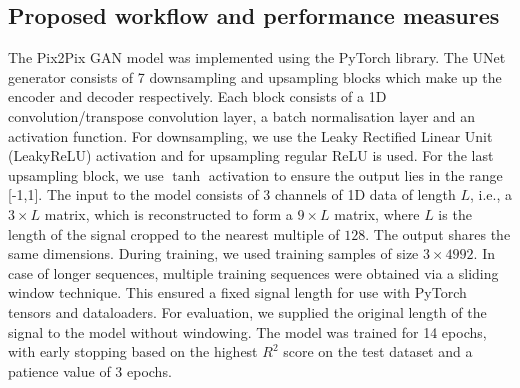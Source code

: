 \documentclass[conference]{IEEEtran}
\begin{document}
\subsection{Proposed workflow and performance measures} 




The Pix2Pix GAN model was implemented using the PyTorch library. The UNet generator consists of 7 downsampling and upsampling blocks which make up the encoder and decoder respectively. Each block consists of a 1D convolution/transpose convolution layer, a batch normalisation layer and an activation function. For downsampling, we use the Leaky Rectified Linear Unit (LeakyReLU) activation and for upsampling regular ReLU is used. For the last upsampling block, we use $\tanh$ activation to ensure the output lies in the range [-1,1]. The input to the model consists of 3 channels of 1D data of length $L$, i.e., a $3\times L$ matrix, which is reconstructed to form a $9\times L$ matrix, where $L$ is the length of the signal cropped to the nearest multiple of $128$. The output shares the same dimensions. During training, we used training samples of size $3 \times 4992$. In case of longer sequences, multiple training sequences were obtained via a sliding window technique. This ensured a fixed signal length for use with PyTorch tensors and dataloaders. For evaluation, we supplied the original length of the signal to the model without windowing. The model was trained for 14 epochs, with early stopping based on the highest $R^2$ score on the test dataset and a patience value of 3 epochs.
\end{document}
